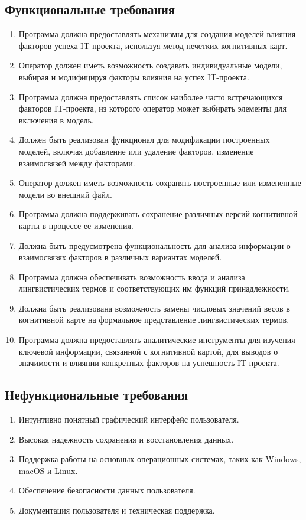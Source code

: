 \documentclass{article}
\begin{document}
    \subsection{Функциональные требования}
    \begin{enumerate}
        \item Программа должна предоставлять механизмы для создания моделей влияния факторов успеха IT-проекта, используя метод нечетких когнитивных карт.
        \item Оператор должен иметь возможность создавать индивидуальные модели, выбирая и модифицируя факторы влияния на успех IT-проекта.
        \item Программа должна предоставлять список наиболее часто встречающихся факторов IT-проекта, из которого оператор может выбирать элементы для включения в модель.
        \item Должен быть реализован функционал для модификации построенных моделей, включая добавление или удаление факторов, изменение взаимосвязей между факторами.
        \item Оператор должен иметь возможность сохранять построенные или измененные модели во внешний файл.
        \item Программа должна поддерживать сохранение различных версий когнитивной карты в процессе ее изменения.
        \item Должна быть предусмотрена функциональность для анализа информации о взаимосвязях факторов в различных вариантах моделей.
        \item Программа должна обеспечивать возможность ввода и анализа лингвистических термов и соответствующих им функций принадлежности.
        \item Должна быть реализована возможность замены числовых значений весов в когнитивной карте на формальное представление лингвистических термов.
        \item Программа должна предоставлять аналитические инструменты для изучения ключевой информации, связанной с когнитивной картой, для выводов о значимости и влиянии конкретных факторов на успешность IT-проекта.
    \end{enumerate}

    \subsection{Нефункциональные требования}
    \begin{enumerate}
        \item Интуитивно понятный графический интерфейс пользователя.
        \item Высокая надежность сохранения и восстановления данных.
        \item Поддержка работы на основных операционных системах, таких как Windows, macOS и Linux.
        \item Обеспечение безопасности данных пользователя.
        \item Документация пользователя и техническая поддержка.
    \end{enumerate}
\end{document}

